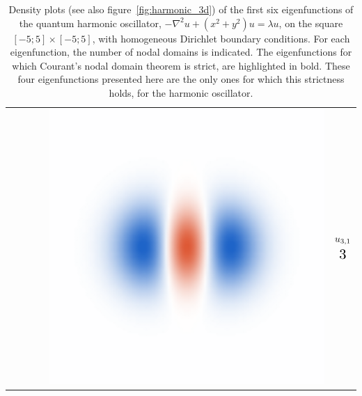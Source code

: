 \begin{table}
\begin{center}
\begin{tabular}{rlrl|rl|}
      \cline{3-6}                                                                                                          &                                                      &                                                                                                                      &                                & \parbox[c]{\hoWidth}{\vspace{2pt}\includegraphics[width=\linewidth]{img/chapter3/counting/harmonic/6c.png}\vspace{2pt}} & $ \begin{matrix} u_{3,1} \vspace{5pt}\\ \scalebox{1.5}{$3$} \end{matrix} $  \\
    \end{tabular}
    \caption{\label{tab:courant_harmonic}Density plots (see also figure~\ref{fig:harmonic_3d}) of the first six eigenfunctions of the quantum harmonic oscillator, $-\nabla^2 u + (x^2+y^2) u = \lambda u$, on the square $[-5;5]\times [-5;5]$, with homogeneous Dirichlet boundary conditions. For each eigenfunction, the number of nodal domains is indicated. The eigenfunctions for which Courant's nodal domain theorem is strict, are highlighted in bold. These four eigenfunctions presented here are the only ones for which this strictness holds, for the harmonic oscillator. }
  \end{center}
\end{table}

